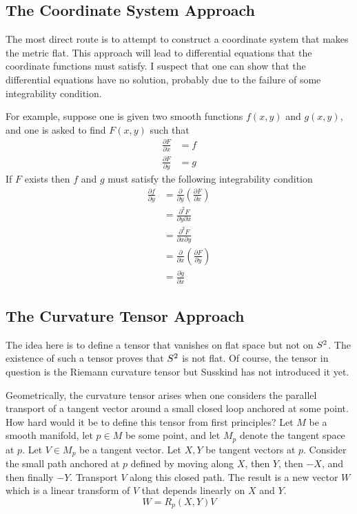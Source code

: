 \documentclass[11pt, oneside]{article}
\begin{document}
\subsection{The Coordinate System Approach}
 
The most direct route is to attempt to construct a coordinate system that makes the metric flat.
This approach will lead to differential equations that the coordinate functions must satisfy.
I suspect that one can show that the differential equations have no solution, probably due to the failure of some
integrability condition.

For example, suppose one is given two smooth functions $f(x,y)$ and $g(x,y)$, and one is asked to find $F(x,y)$ such that
\begin{align}
	\frac{\partial F}{\partial x}	&= f \\
	\frac{\partial F}{\partial y}	&= g
\end{align}
If $F$ exists then $f$ and $g$ must satisfy the following integrability condition
\begin{equation}
\begin{split}
	\frac{\partial f}{\partial y} 	& = \frac{\partial}{\partial y} \left( \frac{\partial F}{\partial x} \right) \\
						& = \frac{\partial^2 F}{\partial y \partial x} \\
						& = \frac{\partial^2 F}{\partial x \partial y} \\
						& = \frac{\partial}{\partial x} \left( \frac{\partial F}{\partial y} \right) \\
						& = \frac{\partial g}{\partial x}
	\end{split}
\end{equation}

\subsection{The Curvature Tensor Approach}

The idea here is to define a tensor that vanishes on flat space but not on $S^2$.
The existence of such a tensor proves that $S^2$ is not flat.
Of course, the tensor in question is the Riemann curvature tensor but Susskind has not introduced it yet.

Geometrically, the curvature tensor arises when one considers the parallel transport of a tangent vector around a
small closed loop anchored at some point.
How hard would it be to define this tensor from first principles?
Let $M$ be a smooth manifold, let $p \in M$ be some point, and let $M_p$ denote the tangent space at $p$.
Let $V \in M_p$ be a tangent vector.
Let $X, Y$ be tangent vectors at $p$.
Consider the small path anchored at $p$ defined by moving along $X$, then $Y$, then $-X$, and then finally $-Y$.
Transport $V$ along this closed path.
The result is a new vector $W$ which is a linear transform of $V$ that depends linearly on $X$ and $Y$.
\begin{equation}
	W = R_p(X,Y)V
\end{equation}
\end{document}
